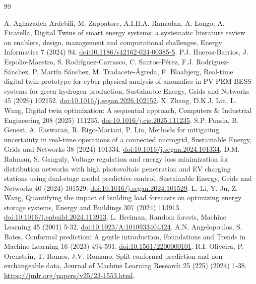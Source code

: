 \documentclass[11pt,a4paper]{article}
\begin{document}
\begin{thebibliography}{99}
\small\raggedright
{} A. Aghazadeh Ardebili, M. Zappatore, A.I.H.A. Ramadan, A. Longo, A. Ficarella, Digital Twins of smart energy systems: a systematic literature review on enablers, design, management and computational challenges, Energy Informatics 7 (2024) 94. \href{https://doi.org/10.1186/s42162-024-00385-5}{doi:10.1186/s42162-024-00385-5}.
 P.J. Hueros-Barrios, J. Espolio-Maestro, S. Rodr\'iguez-Carrasco, C. Santos-P\'erez, F.J. Rodr\'iguez-S\'anchez, P. Mart\'in S\'anchez, M. Tradacete-\'Agreda, F. Blaabjerg, Real-time digital twin prototype for cyber-physical analysis of anomalies in PV-PEM-BESS systems for green hydrogen production, Sustainable Energy, Grids and Networks 45 (2026) 102152. \href{https://doi.org/10.1016/j.segan.2026.102152}{doi:10.1016/j.segan.2026.102152}.
 X. Zhang, D.K.J. Lin, L. Wang, Digital twin optimization: A sequential approach, Computers \& Industrial Engineering 208 (2025) 111235. \href{https://doi.org/10.1016/j.cie.2025.111235}{doi:10.1016/j.cie.2025.111235}.
 S.P. Panda, B. Genest, A. Easwaran, R. Rigo-Mariani, P. Lin, Methods for mitigating uncertainty in real-time operations of a connected microgrid, Sustainable Energy, Grids and Networks 38 (2024) 101334. \href{https://doi.org/10.1016/j.segan.2024.101334}{doi:10.1016/j.segan.2024.101334}.
 D.M. Rahman, S. Ganguly, Voltage regulation and energy loss minimization for distribution networks with high photovoltaic penetration and EV charging stations using dual-stage model predictive control, Sustainable Energy, Grids and Networks 40 (2024) 101529. \href{https://doi.org/10.1016/j.segan.2024.101529}{doi:10.1016/j.segan.2024.101529}.
 L. Li, Y. Ju, Z. Wang, Quantifying the impact of building load forecasts on optimizing energy storage systems, Energy and Buildings 307 (2024) 113913. \href{https://doi.org/10.1016/j.enbuild.2024.113913}{doi:10.1016/j.enbuild.2024.113913}.
 L. Breiman, Random forests, Machine Learning 45 (2001) 5-32. \href{https://doi.org/10.1023/A:1010933404324}{doi:10.1023/A:1010933404324}.
 A.N. Angelopoulos, S. Bates, Conformal prediction: A gentle introduction, Foundations and Trends in Machine Learning 16 (2023) 494-591. \href{https://doi.org/10.1561/2200000101}{doi:10.1561/2200000101}.
 R.I. Oliveira, P. Orenstein, T. Ramos, J.V. Romano, Split conformal prediction and non-exchangeable data, Journal of Machine Learning Research 25 (225) (2024) 1-38. \url{https://jmlr.org/papers/v25/23-1553.html}.

\end{thebibliography}
\end{document}
